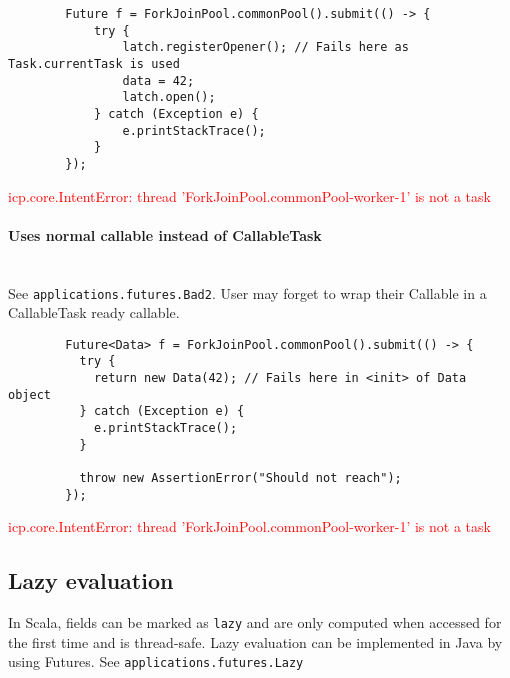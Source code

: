\documentclass[11pt]{article}
\begin{document}
    \begin{lstlisting}
        Future f = ForkJoinPool.commonPool().submit(() -> {
            try {
                latch.registerOpener(); // Fails here as Task.currentTask is used
                data = 42;
                latch.open();
            } catch (Exception e) {
                e.printStackTrace();
            }
        });
    \end{lstlisting}

    \textcolor{red}{icp.core.IntentError: thread 'ForkJoinPool.commonPool-worker-1' is not a task}

    \paragraph{Uses normal callable instead of CallableTask}\mbox{} \\
    See \lstinline{applications.futures.Bad2}. User may forget to wrap their Callable in a
    CallableTask ready callable.

    \begin{lstlisting}
        Future<Data> f = ForkJoinPool.commonPool().submit(() -> {
          try {
            return new Data(42); // Fails here in <init> of Data object
          } catch (Exception e) {
            e.printStackTrace();
          }

          throw new AssertionError("Should not reach");
        });
    \end{lstlisting}

    \textcolor{red}{icp.core.IntentError: thread 'ForkJoinPool.commonPool-worker-1' is not a task}

    \subsection{Lazy evaluation}
    In Scala, fields can be marked as \lstinline{lazy} and are only computed when accessed for the first time and
    is thread-safe. Lazy evaluation can be implemented in Java by using Futures. See \lstinline{applications.futures.Lazy}
\end{document}
